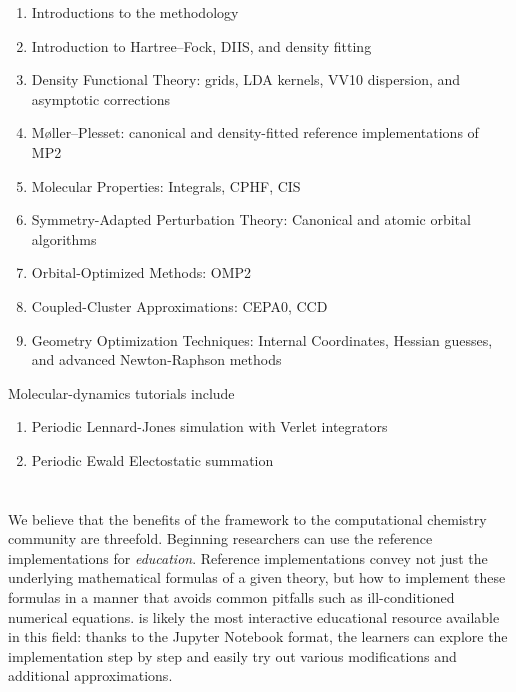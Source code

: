 \begin{enumerate}
\item Introductions to the \pfn methodology
\item Introduction to Hartree--Fock, DIIS, and density fitting
\item Density Functional Theory: grids, LDA kernels, VV10 dispersion, and asymptotic corrections
\item M\o ller--Plesset: canonical and density-fitted reference implementations of MP2
\item Molecular Properties: Integrals, CPHF, CIS
\item Symmetry-Adapted Perturbation Theory: Canonical and atomic orbital algorithms
\item Orbital-Optimized Methods: OMP2
\item Coupled-Cluster Approximations: CEPA0, CCD
\item  Geometry Optimization Techniques: Internal Coordinates, Hessian guesses, and advanced Newton-Raphson methods
\end{enumerate}
Molecular-dynamics tutorials include
\begin{enumerate}
\item Periodic Lennard-Jones simulation with Verlet integrators
\item Periodic Ewald Electostatic summation
\end{enumerate}

\section{\texorpdfstring{}{Conclusions}}

We believe that the benefits of the \pfn framework to the computational chemistry community are threefold.  Beginning researchers can use the \pfn reference implementations for \emph{education}. Reference implementations convey not just the underlying mathematical formulas of a given theory, but how to implement these formulas in a manner that avoids common pitfalls such as ill-conditioned numerical equations. \pfn is likely the most interactive educational resource available in this field: thanks to the Jupyter Notebook format, the learners can explore the implementation step by step and easily try out various modifications and additional approximations.

